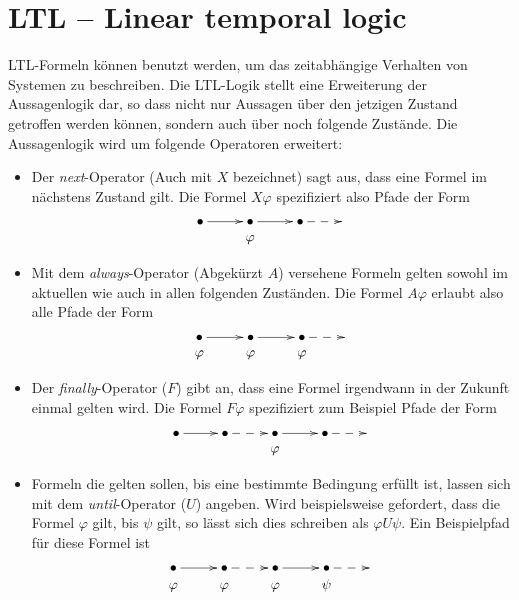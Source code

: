 \section{LTL -- Linear temporal logic}
LTL-Formeln können benutzt werden, um das zeitabhängige Verhalten von Systemen zu beschreiben\cite{ltlbasics}.
Die LTL-Logik stellt eine Erweiterung der Aussagenlogik dar, so dass nicht nur Aussagen über den jetzigen Zustand getroffen werden können, sondern auch über noch folgende Zustände.
Die Aussagenlogik wird um folgende Operatoren erweitert:
\begin{itemize}
\item Der \emph{next}-Operator (Auch mit $X$ bezeichnet) sagt aus, dass eine Formel im nächstens Zustand gilt.
  Die Formel $X\varphi$ spezifiziert also Pfade der Form
  \[ \xymatrix @R=0em {
      \bullet \ar[r] & \bullet \ar[r] & \bullet \ar@{-->}[r] &\\
      & \varphi & &
  }
    \]
\item Mit dem \emph{always}-Operator (Abgekürzt $A$) versehene Formeln gelten sowohl im aktuellen wie auch in allen folgenden Zuständen.
  Die Formel $A\varphi$ erlaubt also alle Pfade der Form
  \[ \xymatrix @R=0em {
      \bullet \ar[r] & \bullet \ar[r] & \bullet \ar@{-->}[r] &\\
      \varphi & \varphi & \varphi &
  }
    \]
\item Der \emph{finally}-Operator ($F$) gibt an, dass eine Formel irgendwann in der Zukunft einmal gelten wird.
  Die Formel $F\varphi$ spezifiziert zum Beispiel Pfade der Form
  \[ \xymatrix @R=0em {
    \bullet \ar[r] & \bullet \ar@{-->}[r] & \bullet \ar[r] & \bullet \ar@{-->}[r] & \\
    & & \varphi & &
  } \]
\item Formeln die gelten sollen, bis eine bestimmte Bedingung erfüllt ist, lassen sich mit dem \emph{until}-Operator ($U$) angeben.
  Wird beispielsweise gefordert, dass die Formel $\varphi$ gilt, bis $\psi$ gilt, so lässt sich dies schreiben als $\varphi U\psi$.
  Ein Beispielpfad für diese Formel ist
  \[ \xymatrix @R=0em {
    \bullet \ar[r] & \bullet \ar@{-->}[r] & \bullet \ar[r] & \bullet \ar@{-->}[r] & \\
    \varphi & \varphi & \varphi & \psi &
  } \]
\end{itemize}
